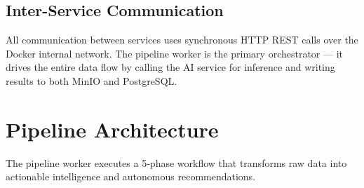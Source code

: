\subsection{Inter-Service Communication}

All communication between services uses synchronous HTTP REST calls over the Docker internal network. The pipeline worker is the primary orchestrator --- it drives the entire data flow by calling the AI service for inference and writing results to both MinIO and PostgreSQL.

\section{Pipeline Architecture}
\label{sec:arch-pipeline}

The pipeline worker executes a 5-phase workflow that transforms raw data into actionable intelligence and autonomous recommendations.

